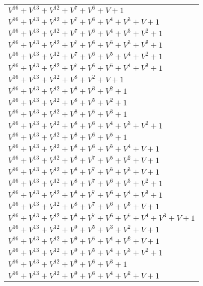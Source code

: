 \documentclass[12pt]{article}
\begin{document}
\begin{adjustwidth}{-4cm}{}
\begin{center}
\begin{longtable}{|l|}
$V^{16}  +V^{13}  +V^{12}  +V^{7}  +V^{6}  + V + 1$ \\
$V^{16}  +V^{13}  +V^{12}  +V^{7}  +V^{6}  +V^{4}  +V^{3}  + V + 1$ \\
$V^{16}  +V^{13}  +V^{12}  +V^{7}  +V^{6}  +V^{4}  +V^{3}  +V^{2}  + 1$ \\
$V^{16}  +V^{13}  +V^{12}  +V^{7}  +V^{6}  +V^{5}  +V^{3}  +V^{2}  + 1$ \\
$V^{16}  +V^{13}  +V^{12}  +V^{7}  +V^{6}  +V^{5}  +V^{4}  +V^{2}  + 1$ \\
$V^{16}  +V^{13}  +V^{12}  +V^{7}  +V^{6}  +V^{5}  +V^{4}  +V^{3}  + 1$ \\
$V^{16}  +V^{13}  +V^{12}  +V^{8}  +V^{2}  + V + 1$ \\
$V^{16}  +V^{13}  +V^{12}  +V^{8}  +V^{3}  +V^{2}  + 1$ \\
$V^{16}  +V^{13}  +V^{12}  +V^{8}  +V^{5}  +V^{2}  + 1$ \\
$V^{16}  +V^{13}  +V^{12}  +V^{8}  +V^{5}  +V^{3}  + 1$ \\
$V^{16}  +V^{13}  +V^{12}  +V^{8}  +V^{6}  +V^{4}  +V^{3}  +V^{2}  + 1$ \\
$V^{16}  +V^{13}  +V^{12}  +V^{8}  +V^{6}  +V^{5}  + 1$ \\
$V^{16}  +V^{13}  +V^{12}  +V^{8}  +V^{6}  +V^{5}  +V^{4}  + V + 1$ \\
$V^{16}  +V^{13}  +V^{12}  +V^{8}  +V^{7}  +V^{5}  +V^{2}  + V + 1$ \\
$V^{16}  +V^{13}  +V^{12}  +V^{8}  +V^{7}  +V^{5}  +V^{3}  + V + 1$ \\
$V^{16}  +V^{13}  +V^{12}  +V^{8}  +V^{7}  +V^{6}  +V^{3}  +V^{2}  + 1$ \\
$V^{16}  +V^{13}  +V^{12}  +V^{8}  +V^{7}  +V^{6}  +V^{4}  +V^{3}  + 1$ \\
$V^{16}  +V^{13}  +V^{12}  +V^{8}  +V^{7}  +V^{6}  +V^{5}  + V + 1$ \\
$V^{16}  +V^{13}  +V^{12}  +V^{8}  +V^{7}  +V^{6}  +V^{5}  +V^{4}  +V^{3}  + V + 1$ \\
$V^{16}  +V^{13}  +V^{12}  +V^{9}  +V^{5}  +V^{3}  +V^{2}  + V + 1$ \\
$V^{16}  +V^{13}  +V^{12}  +V^{9}  +V^{5}  +V^{4}  +V^{2}  + V + 1$ \\
$V^{16}  +V^{13}  +V^{12}  +V^{9}  +V^{5}  +V^{4}  +V^{3}  +V^{2}  + 1$ \\
$V^{16}  +V^{13}  +V^{12}  +V^{9}  +V^{6}  +V^{3}  + 1$ \\
$V^{16}  +V^{13}  +V^{12}  +V^{9}  +V^{6}  +V^{4}  +V^{2}  + V + 1$ \\

\end{longtable}
\end{center}
\end{adjustwidth}
\end{document}
